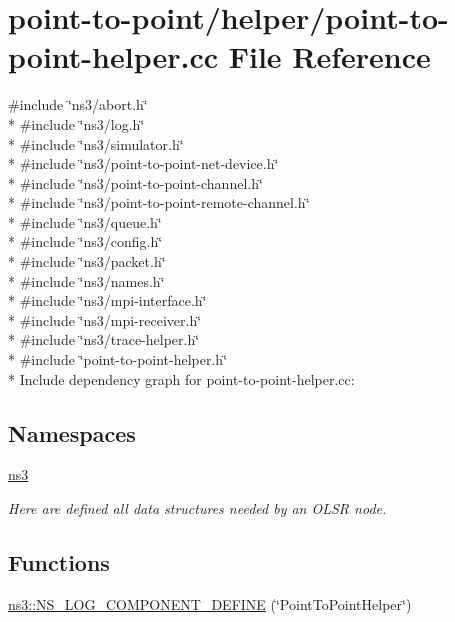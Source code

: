 \hypertarget{point-to-point-helper_8cc}{}\section{point-\/to-\/point/helper/point-\/to-\/point-\/helper.cc File Reference}
\label{point-to-point-helper_8cc}
{\ttfamily \#include \char`\"{}ns3/abort.\+h\char`\"{}}\\*
{\ttfamily \#include \char`\"{}ns3/log.\+h\char`\"{}}\\*
{\ttfamily \#include \char`\"{}ns3/simulator.\+h\char`\"{}}\\*
{\ttfamily \#include \char`\"{}ns3/point-\/to-\/point-\/net-\/device.\+h\char`\"{}}\\*
{\ttfamily \#include \char`\"{}ns3/point-\/to-\/point-\/channel.\+h\char`\"{}}\\*
{\ttfamily \#include \char`\"{}ns3/point-\/to-\/point-\/remote-\/channel.\+h\char`\"{}}\\*
{\ttfamily \#include \char`\"{}ns3/queue.\+h\char`\"{}}\\*
{\ttfamily \#include \char`\"{}ns3/config.\+h\char`\"{}}\\*
{\ttfamily \#include \char`\"{}ns3/packet.\+h\char`\"{}}\\*
{\ttfamily \#include \char`\"{}ns3/names.\+h\char`\"{}}\\*
{\ttfamily \#include \char`\"{}ns3/mpi-\/interface.\+h\char`\"{}}\\*
{\ttfamily \#include \char`\"{}ns3/mpi-\/receiver.\+h\char`\"{}}\\*
{\ttfamily \#include \char`\"{}ns3/trace-\/helper.\+h\char`\"{}}\\*
{\ttfamily \#include \char`\"{}point-\/to-\/point-\/helper.\+h\char`\"{}}\\*
Include dependency graph for point-\/to-\/point-\/helper.cc\+:
\subsection*{Namespaces}
\begin{DoxyCompactItemize}
\item 
 \hyperlink{namespacens3}{ns3}
\begin{DoxyCompactList}\small\item\em Here are defined all data structures needed by an O\+L\+SR node. \end{DoxyCompactList}\end{DoxyCompactItemize}
\subsection*{Functions}
\begin{DoxyCompactItemize}
\item 
\hyperlink{namespacens3_ab573f95cad2284c8398c3832f97c26fa}{ns3\+::\+N\+S\+\_\+\+L\+O\+G\+\_\+\+C\+O\+M\+P\+O\+N\+E\+N\+T\+\_\+\+D\+E\+F\+I\+NE} (\char`\"{}Point\+To\+Point\+Helper\char`\"{})
\end{DoxyCompactItemize}
